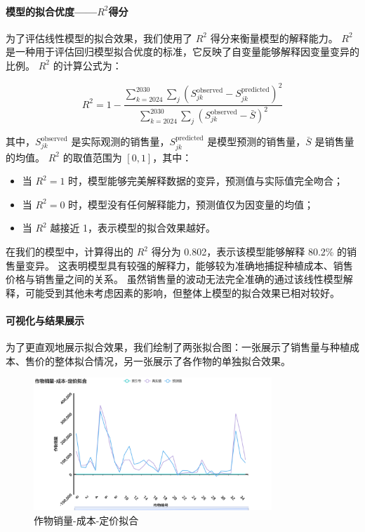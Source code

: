 \documentclass[12pt,a4paper]{nmmcm}
\begin{document}
\paragraph{模型的拟合优度——$R^2$得分}

为了评估线性模型的拟合效果，我们使用了 $R^2$ 得分来衡量模型的解释能力。
$R^2$ 是一种用于评估回归模型拟合优度的标准，它反映了自变量能够解释因变量变异的比例。
$R^2$ 的计算公式为：

\[
  R^2 = 1 - \frac{\sum_{k=2024}^{2030} \sum_{j} \left( S_{jk}^{\text{observed}} - S_{jk}^{\text{predicted}} \right)^2}{\sum_{k=2024}^{2030} \sum_{j} \left( S_{jk}^{\text{observed}} - \bar{S} \right)^2}
\]

其中，$S_{jk}^{\text{observed}}$ 是实际观测的销售量，$S_{jk}^{\text{predicted}}$ 是模型预测的销售量，$\bar{S}$ 是销售量的均值。
$R^2$ 的取值范围为 $[0,1]$，其中：
\begin{itemize}
  \item 当 $R^2 = 1$ 时，模型能够完美解释数据的变异，预测值与实际值完全吻合；
  \item 当 $R^2 = 0$ 时，模型没有任何解释能力，预测值仅为因变量的均值；
  \item 当 $R^2$ 越接近 1，表示模型的拟合效果越好。

\end{itemize}

在我们的模型中，计算得出的 $R^2$ 得分为 0.802，表示该模型能够解释 80.2\% 的销售量变异。
这表明模型具有较强的解释力，能够较为准确地捕捉种植成本、销售价格与销售量之间的关系。
虽然销售量的波动无法完全准确的通过该线性模型解释，可能受到其他未考虑因素的影响，但整体上模型的拟合效果已相对较好。


\paragraph{可视化与结果展示}

为了更直观地展示拟合效果，我们绘制了两张拟合图：一张展示了销售量与种植成本、售价的整体拟合情况，另一张展示了各作物的单独拟合效果。


\begin{figure}[H]
  \centering
  \includegraphics[width=0.8\textwidth]{figures/prob3/correlation/作物销量-成本-定价拟合.png}
  \caption{作物销量-成本-定价拟合}
  \label{fig:fitting1}
\end{figure}
\end{document}
